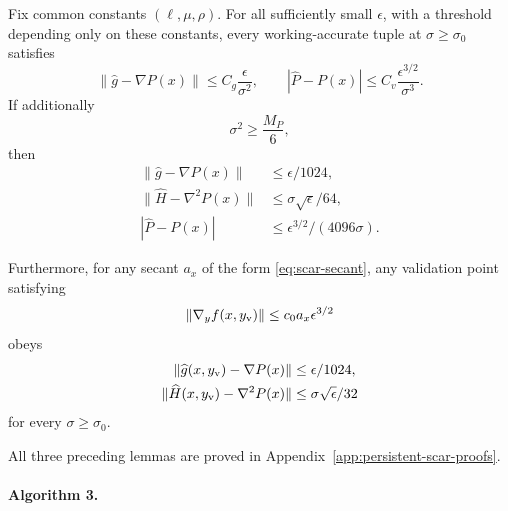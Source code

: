 \begin{lemma}
\label{lem:gs-working-errors}
Fix common constants $(\ell,\mu,\rho)$.
For all sufficiently small $\epsilon$, with a threshold depending
only on these constants, every working-accurate tuple at
$\sigma\ge\sigma_0$ satisfies
\begin{equation}
    \|\widehat g-\nabla P(x)\|
    \le
    C_g\frac{\epsilon}{\sigma^2},
    \qquad
    |\widehat P-P(x)|
    \le
    C_v\frac{\epsilon^{3/2}}{\sigma^3}.
    \label{eq:gs-working-errors}
\end{equation}
If additionally
\[
    \sigma^2\ge\frac{M_P}{6},
\]
then
\begin{equation}
\begin{aligned}
    \|\widehat g-\nabla P(x)\|
    &\le
    \epsilon/1024,
    \\
    \|\widehat H-\nabla^2P(x)\|
    &\le
    \sigma\sqrt\epsilon/64,
    \\
    |\widehat P-P(x)|
    &\le
    \epsilon^{3/2}/(4096\sigma).
\end{aligned}
\label{eq:working-safe-errors}
\end{equation}

Furthermore, for any secant $a_x$ of the form
\eqref{eq:scar-secant}, any validation point satisfying
\begin{equation}
    \|\nabla_yf(x,y_{\rm v})\|
    \le
    c_0a_x\epsilon^{3/2}
    \label{eq:validator-residual}
\end{equation}
obeys
\begin{equation}
\begin{aligned}
    \|\widehat g(x,y_{\rm v})-\nabla P(x)\|
    &\le
    \epsilon/1024,
    \\
    \|\widehat H(x,y_{\rm v})-\nabla^2P(x)\|
    &\le
    \sigma\sqrt\epsilon/32
\end{aligned}
\label{eq:validator-errors}
\end{equation}
for every $\sigma\ge\sigma_0$.
\end{lemma}

All three preceding lemmas are proved in
Appendix~\ref{app:persistent-scar-proofs}.


\paragraph{Algorithm 3.}

